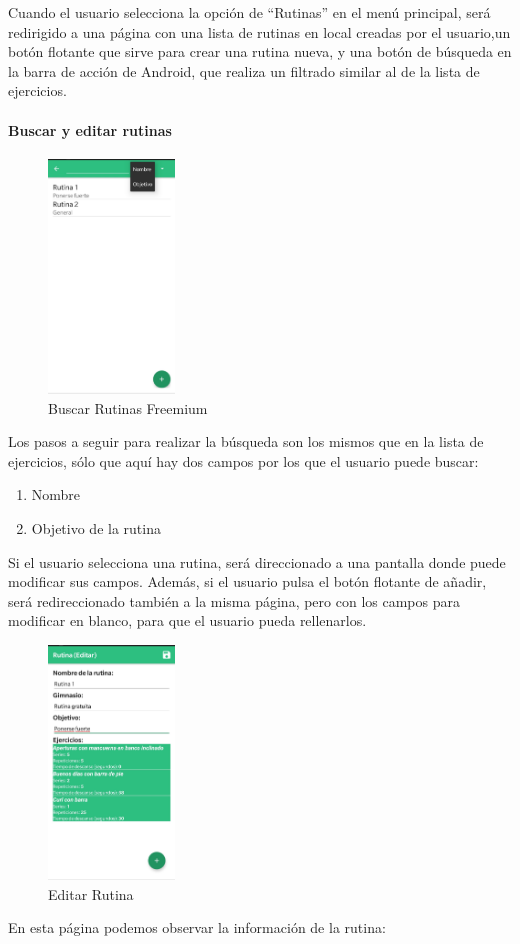 \documentclass[11pt,a4paper]{report}
\begin{document}
Cuando el usuario selecciona la opción de “Rutinas” en el menú principal, será redirigido a una página con una lista de rutinas en local creadas por el usuario,un botón flotante que sirve para crear una rutina nueva, y una botón de búsqueda en la barra de acción de Android, que realiza un filtrado similar al de la lista de ejercicios.

\paragraph{Buscar y editar rutinas}
\begin{figure}[H]
	\centering
	\includegraphics[width=0.3\textwidth]{graficos/manual/BuscarRutinasFreemium.jpg}
	\caption{Buscar Rutinas Freemium}
\end{figure}

Los pasos a seguir para realizar la búsqueda son los mismos que en la lista de ejercicios, sólo que aquí hay dos campos por los que el usuario puede buscar:

\begin{enumerate}
	\item Nombre
	\item Objetivo de la rutina
\end{enumerate}	
Si el usuario selecciona una rutina, será direccionado a una pantalla donde puede modificar sus campos. Además, si el usuario pulsa el botón flotante de añadir, será redireccionado también a la misma página, pero con los campos para modificar en blanco, para que el usuario pueda rellenarlos.
\begin{figure}[H]
	\centering
	\includegraphics[width=0.3\textwidth]{graficos/manual/EditarRutina.jpg}
	\caption{Editar Rutina}
\end{figure}
En esta página podemos observar la información de la rutina:
\end{document}
